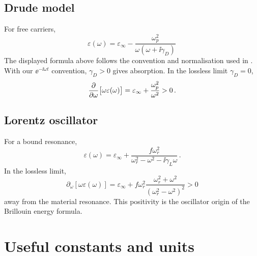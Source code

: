 \subsection{Drude model}
\label{sec:appD-drude}

For free carriers,
\begin{equation}\label{eq:appD-drude}
  \varepsilon(\omega)=\varepsilon_\infty-
  \frac{\omega_p^2}{\omega(\omega+\ii\gamma_D)}\,
\end{equation}
The displayed formula above follows the convention and normalisation used in \cite{press2026photonic}.
With our $\ee^{-\ii\omega t}$ convention, $\gamma_D>0$ gives
absorption.  In the lossless limit $\gamma_D=0$,
\begin{equation}\label{eq:appD-drude-energy}
  \frac{\partial }{\partial \omega}\bigl[\omega\varepsilon(\omega)\bigr]
  =\varepsilon_\infty+\frac{\omega_p^2}{\omega^2}>0\,.
\end{equation}

\subsection{Lorentz oscillator}
\label{sec:appD-lorentz}

For a bound resonance,
\begin{equation}\label{eq:appD-lorentz}
  \varepsilon(\omega)=\varepsilon_\infty+
  \frac{f\omega_r^2}{\omega_r^2-\omega^2-\ii\gamma_L\omega}\,.
\end{equation}
In the lossless limit,
\begin{equation}\label{eq:appD-lorentz-energy}
  \partial_\omega[\omega\varepsilon(\omega)]
  =\varepsilon_\infty+f\omega_r^2\frac{\omega_r^2+\omega^2}{(\omega_r^2-\omega^2)^2}>0
\end{equation}
away from the material resonance.  This positivity is the oscillator
origin of the Brillouin energy formula.

\section{Useful constants and units}
\label{sec:appD-units}

